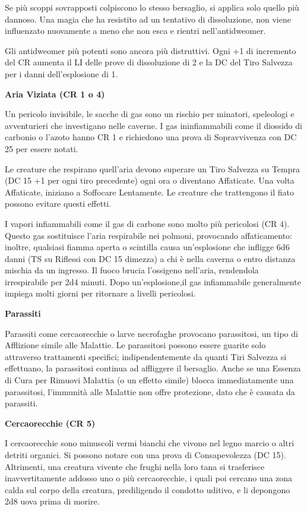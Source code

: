 \documentclass[a4paper,11pt,twoside,openany]{book}
\begin{document}
Se più scoppi sovrapposti colpiscono lo stesso bersaglio, si applica solo quello più dannoso. Una magia che ha resistito ad un tentativo di dissoluzione, non viene influenzato nuovamente a meno che non esca e rientri nell'antidweomer.

Gli antidweomer più potenti sono ancora più distruttivi. Ogni +1 di incremento del CR aumenta il LI delle prove di dissoluzione di 2 e la DC del Tiro Salvezza per i danni dell'esplosione di 1.

\textbf{Aria Viziata (CR 1 o 4)}

Un pericolo invisibile, le sacche di gas sono un rischio per minatori, speleologi e avventurieri che investigano nelle caverne. I gas ininfiammabili come il diossido di carbonio o l'azoto hanno CR 1 e richiedono una prova di Sopravvivenza con DC 25 per essere notati.

Le creature che respirano quell'aria devono superare un Tiro Salvezza su Tempra (DC 15 +1 per ogni tiro precedente) ogni ora o diventano Affaticate. Una volta Affaticate, iniziano a Soffocare Lentamente. Le creature che trattengono il fiato possono evitare questi effetti.

I vapori infiammabili come il gas di carbone sono molto più pericolosi (CR 4). Questo gas sostituisce l'aria respirabile nei polmoni, provocando affaticamento: inoltre, qualsiasi fiamma aperta o scintilla causa un'esplosione che infligge 6d6 danni (TS su Riflessi con DC 15 dimezza) a chi è nella caverna o entro distanza mischia da un ingresso. Il fuoco brucia l'ossigeno nell'aria, rendendola irrespirabile per 2d4 minuti. Dopo un'esplosione,il gas infiammabile generalmente impiega molti giorni per ritornare a livelli pericolosi.

\textbf{Parassiti}

Parassiti come cercaorecchie o larve necrofaghe provocano parassitosi, un tipo di Afflizione simile alle Malattie. Le parassitosi possono essere guarite solo attraverso trattamenti specifici; indipendentemente da quanti Tiri Salvezza si effettuano, la parassitosi continua ad affliggere il bersaglio. Anche se una Essenza di Cura per Rimuovi Malattia (o un effetto simile) blocca immediatamente una parassitosi, l'immunità alle Malattie non offre protezione, dato che è causata da parassiti.

\textbf{Cercaorecchie (CR 5)}

I cercaorecchie sono minuscoli vermi bianchi che vivono nel legno marcio o altri detriti organici. Si possono notare con una prova di Consapevolezza (DC 15). Altrimenti, una creatura vivente che frughi nella loro tana si trasferisce inavvertitamente addosso uno o più cercaorecchie, i quali poi cercano una zona calda sul corpo della creatura, prediligendo il condotto uditivo, e li depongono 2d8 uova prima di morire.
\end{document}
